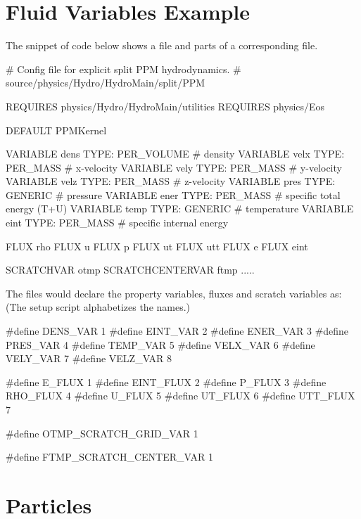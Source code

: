 \section{Fluid Variables Example}
The snippet of code below shows a  file and
parts of a corresponding  file.  

\begin{codeseg}
# Config file for explicit split PPM hydrodynamics.
# source/physics/Hydro/HydroMain/split/PPM  

REQUIRES physics/Hydro/HydroMain/utilities
REQUIRES physics/Eos

DEFAULT PPMKernel

VARIABLE dens TYPE: PER_VOLUME       # density
VARIABLE velx TYPE: PER_MASS         # x-velocity
VARIABLE vely TYPE: PER_MASS         # y-velocity
VARIABLE velz TYPE: PER_MASS         # z-velocity
VARIABLE pres TYPE: GENERIC          # pressure
VARIABLE ener TYPE: PER_MASS         # specific total energy (T+U)
VARIABLE temp TYPE: GENERIC          # temperature
VARIABLE eint TYPE: PER_MASS         # specific internal energy

FLUX rho
FLUX u
FLUX p
FLUX ut
FLUX utt
FLUX e
FLUX eint

SCRATCHVAR otmp
SCRATCHCENTERVAR ftmp
.....
\end{codeseg}

The  files would declare the property variables, fluxes
and scratch variables as:
(The setup script alphabetizes the names.)

\begin{codeseg}
#define DENS_VAR 1
#define EINT_VAR 2
#define ENER_VAR 3
#define PRES_VAR 4
#define TEMP_VAR 5
#define VELX_VAR 6
#define VELY_VAR 7
#define VELZ_VAR 8

#define E_FLUX 1 
#define EINT_FLUX 2 
#define P_FLUX 3
#define RHO_FLUX 4 
#define U_FLUX 5
#define UT_FLUX 6 
#define UTT_FLUX 7 

#define OTMP_SCRATCH_GRID_VAR 1

#define FTMP_SCRATCH_CENTER_VAR 1

\end{codeseg}


\section{Particles }
\label{Sec:FlashHparticles}

